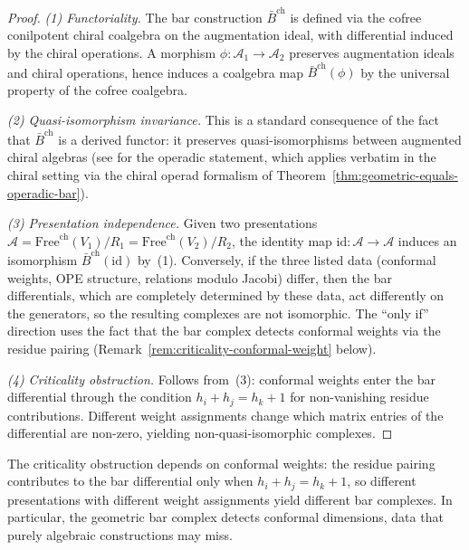    \begin{proof}
   \emph{(1) Functoriality.} The bar construction $\bar{B}^{\mathrm{ch}}$ is defined via the cofree conilpotent chiral coalgebra on the augmentation ideal, with differential induced by the chiral operations.  A morphism $\phi\colon \mathcal{A}_1 \to \mathcal{A}_2$ preserves augmentation ideals and chiral operations, hence induces a coalgebra map $\bar{B}^{\mathrm{ch}}(\phi)$ by the universal property of the cofree coalgebra.

   \emph{(2) Quasi-isomorphism invariance.} This is a standard consequence of the fact that $\bar{B}^{\mathrm{ch}}$ is a derived functor: it preserves quasi-isomorphisms between augmented chiral algebras (see \cite[Theorem~2.2.4]{LV12} for the operadic statement, which applies verbatim in the chiral setting via the chiral operad formalism of Theorem~\ref{thm:geometric-equals-operadic-bar}).

   \emph{(3) Presentation independence.} Given two presentations $\mathcal{A} = \mathrm{Free}^{\mathrm{ch}}(V_1)/R_1 = \mathrm{Free}^{\mathrm{ch}}(V_2)/R_2$, the identity map $\mathrm{id}\colon \mathcal{A} \to \mathcal{A}$ induces an isomorphism $\bar{B}^{\mathrm{ch}}(\mathrm{id})$ by~(1).  Conversely, if the three listed data (conformal weights, OPE structure, relations modulo Jacobi) differ, then the bar differentials, which are completely determined by these data, act differently on the generators, so the resulting complexes are not isomorphic.  The ``only if'' direction uses the fact that the bar complex detects conformal weights via the residue pairing (Remark~\ref{rem:criticality-conformal-weight} below).

   \emph{(4) Criticality obstruction.} Follows from~(3): conformal weights enter the bar differential through the condition $h_i + h_j = h_k + 1$ for non-vanishing residue contributions. Different weight assignments change which matrix entries of the differential are non-zero, yielding non-quasi-isomorphic complexes.
   \end{proof}
   
   \begin{remark}\label{rem:criticality-conformal-weight}
   The criticality obstruction depends on conformal weights: the residue pairing
   contributes to the bar differential only when $h_i + h_j = h_k + 1$, so
   different presentations with different weight assignments yield different bar
   complexes.  In particular, the geometric bar complex detects conformal
   dimensions, data that purely algebraic constructions may miss.
   \end{remark}
   
